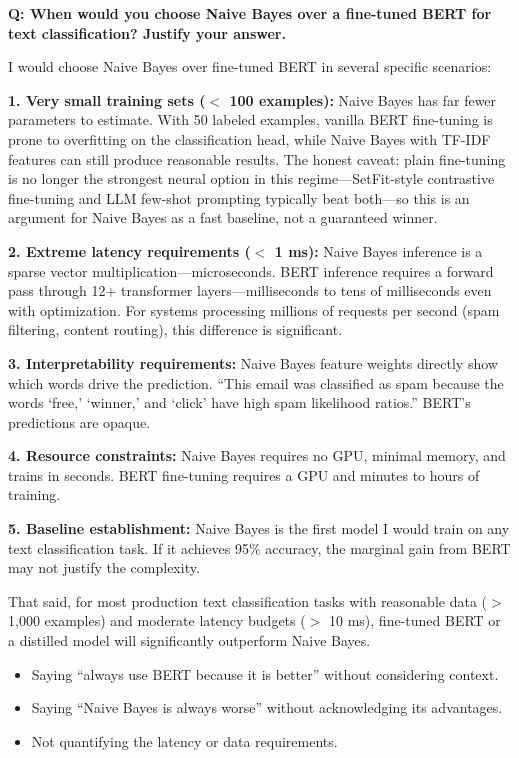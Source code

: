 \begin{interviewq}
\textbf{Q: When would you choose Naive Bayes over a fine-tuned BERT for text classification? Justify your answer.}

 \quad {} \quad \badgefreq{\freqmed}

\stronganswer
I would choose Naive Bayes over fine-tuned BERT in several specific scenarios:

\textbf{1. Very small training sets ($<$ 100 examples):} Naive Bayes has far fewer
parameters to estimate. With 50 labeled examples, vanilla BERT fine-tuning is prone to
overfitting on the classification head, while Naive Bayes with TF-IDF features can still
produce reasonable results. The honest caveat: plain fine-tuning is no longer the strongest
neural option in this regime---SetFit-style contrastive fine-tuning and LLM few-shot
prompting typically beat both---so this is an argument for Naive Bayes as a fast baseline,
not a guaranteed winner.

\textbf{2. Extreme latency requirements ($<$ 1 ms):} Naive Bayes inference is a sparse
vector multiplication---microseconds. BERT inference requires a forward pass through 12+
transformer layers---milliseconds to tens of milliseconds even with optimization. For
systems processing millions of requests per second (spam filtering, content routing), this
difference is significant.

\textbf{3. Interpretability requirements:} Naive Bayes feature weights directly show which
words drive the prediction. ``This email was classified as spam because the words `free,'
`winner,' and `click' have high spam likelihood ratios.'' BERT's predictions are opaque.

\textbf{4. Resource constraints:} Naive Bayes requires no GPU, minimal memory, and trains
in seconds. BERT fine-tuning requires a GPU and minutes to hours of training.

\textbf{5. Baseline establishment:} Naive Bayes is the first model I would train on any
text classification task. If it achieves 95\% accuracy, the marginal gain from BERT may not
justify the complexity.

That said, for most production text classification tasks with reasonable data ($>$ 1,000
examples) and moderate latency budgets ($>$ 10 ms), fine-tuned BERT or a distilled model
will significantly outperform Naive Bayes.

\redflags
\begin{itemize}
    \item Saying ``always use BERT because it is better'' without considering context.
    \item Saying ``Naive Bayes is always worse'' without acknowledging its advantages.
    \item Not quantifying the latency or data requirements.
\end{itemize}


\end{interviewq}
